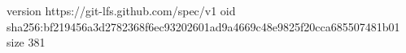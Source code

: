 version https://git-lfs.github.com/spec/v1
oid sha256:bf219456a3d2782368f6ec93202601ad9a4669c48e9825f20cca685507481b01
size 381
